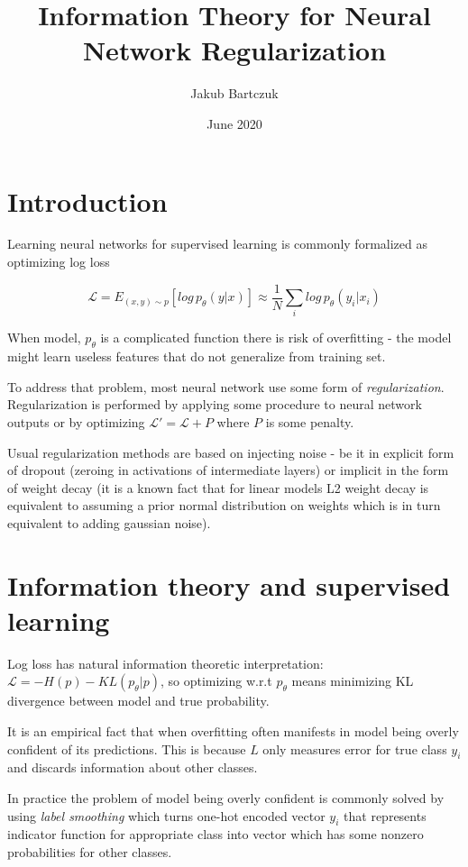 \documentclass{article}
\title{Information Theory for Neural Network Regularization}
\author{Jakub Bartczuk}
\date{June 2020}
\newcommand{\loss}{\mathcal{L}}
\begin{document}
\maketitle

\section{Introduction}

Learning neural networks for supervised learning is commonly formalized as optimizing log loss

$$\loss = E_{(x,y) \sim p}[log\, p_\theta(y|x)] \approx \frac{1}{N} \sum_i log\, p_\theta(y_i|x_i) $$

When model, $p_\theta$ is a complicated function there is risk of overfitting - the model might learn useless features that do not generalize from training set. 

To address that problem, most neural network use some form of \textit{regularization}. Regularization is performed by applying some procedure to neural network outputs or by optimizing $\loss' = \loss + P$ where $P$ is some penalty.

Usual regularization methods are based on injecting noise - be it in explicit form of dropout (zeroing in activations of intermediate layers) or implicit in the form of weight decay (it is a known fact that for linear models L2 weight decay is equivalent to assuming a prior normal distribution on weights which is in turn equivalent to adding gaussian noise).

\section{Information theory and supervised learning}

Log loss has natural information theoretic interpretation: $\loss = - H(p) - KL(p_{\theta}|p)$, so optimizing w.r.t $p_{\theta}$ means minimizing KL divergence between model and true probability. 

It is an empirical fact that when overfitting often manifests in model being overly confident of its predictions. This is because $L$ only measures error for true class $y_i$ and discards information about other classes.

In practice the problem of model being overly confident is commonly solved by using \textit{label smoothing} which turns one-hot encoded vector $y_i$ that represents indicator function for appropriate class into vector which has some nonzero probabilities for other classes. 
\end{document}
